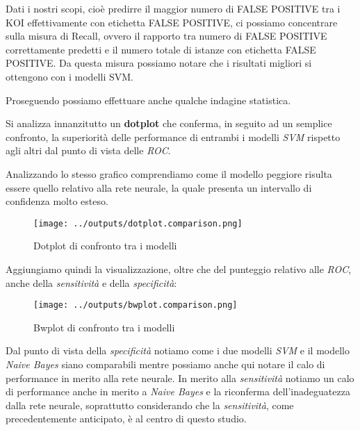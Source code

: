 Dati i nostri scopi, cioè predirre il maggior numero di FALSE POSITIVE tra 
i KOI effettivamente con etichetta FALSE POSITIVE, ci possiamo concentrare sulla
misura di Recall, ovvero il rapporto tra numero di FALSE POSITIVE correttamente 
predetti e il numero totale di istanze con etichetta FALSE POSITIVE. 
Da questa misura possiamo notare che i risultati migliori si ottengono con i 
modelli SVM.

Proseguendo possiamo effettuare anche qualche indagine statistica.

Si analizza innanzitutto un \textbf{dotplot} che conferma, in 
seguito ad un semplice confronto, la superiorità delle performance 
di entrambi i modelli \textit{SVM} rispetto agli altri dal punto 
di vista delle \textit{ROC}.

Analizzando lo stesso grafico comprendiamo come il modello 
peggiore risulta essere quello relativo alla rete neurale, la 
quale presenta un intervallo di confidenza molto esteso.

\begin{figure}[H]
    \centering
    \texttt{[image: ../outputs/dotplot.comparison.png]}
    \caption{Dotplot di confronto tra i modelli}
\end{figure}

Aggiungiamo quindi la visualizzazione, oltre che del punteggio relativo alle 
\textit{ROC}, anche della \textit{sensitività} e della \textit{specificità}:
\begin{figure}[H]
    \centering
    \texttt{[image: ../outputs/bwplot.comparison.png]}
    \caption{Bwplot di confronto tra i modelli}
\end{figure}
Dal punto di vista della \textit{specificità} notiamo come i due modelli 
\textit{SVM} e il modello \textit{Naive Bayes} siano comparabili mentre possiamo 
anche qui notare il calo di performance in merito alla rete neurale. In merito 
alla \textit{sensitività} notiamo un calo di performance anche in merito a 
\textit{Naive Bayes} e la riconferma dell'inadeguatezza dalla rete neurale,
soprattutto considerando che la \textit{sensitività}, come precedentemente 
anticipato, è al centro di questo studio.\\

